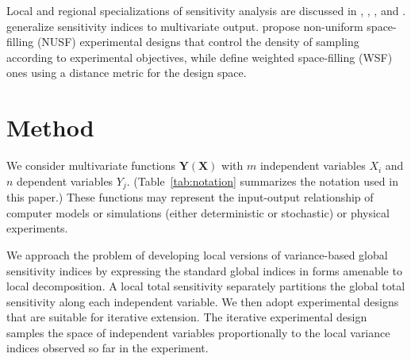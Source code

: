 \documentclass[12pt]{article}
\begin{document}
Local and regional specializations of sensitivity analysis are discussed in \citet{wei_regional_2014}, \citet{wu_application_2017}, \citet{spear_parameter_1994}, and \citet{rose_parameter_1991}. \citet{gamboa_sensitivity_2013} generalize sensitivity indices to multivariate output. \citet{lu_non-uniform_2020} propose non-uniform space-filling (NUSF) experimental designs that control the density of sampling according to experimental objectives, while \citet{bowman_weighted_2013} define weighted space-filling (WSF) ones using a distance metric for the design space.



\section{Method}
\label{sec:meth}

We consider multivariate functions $\mathbf{Y} \left( \mathbf{X} \right)$ with $m$ independent variables $X_i$ and $n$ dependent variables $Y_j$. (Table~\ref{tab:notation} summarizes the notation used in this paper.) These functions may represent the input-output relationship of computer models or simulations (either deterministic or stochastic) or physical experiments.

We approach the problem of developing local versions of variance-based global sensitivity indices by expressing the standard global indices \citep{saltelli_variance_2010} in forms amenable to local decomposition. A local total sensitivity separately partitions the global total sensitivity along each independent variable. We then adopt experimental designs that are suitable for iterative extension. The iterative experimental design samples the space of independent variables proportionally to the local variance indices observed so far in the experiment.
\end{document}
